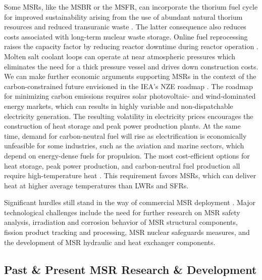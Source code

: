 Some \glspl{MSR}, like the \gls{MSBR} or the \gls{MSFR}, can
incorporate the thorium fuel cycle for improved sustainability arising from the
use of abundant natural thorium resources and reduced transuranic waste
\cite{heuer_towards_2014}. The latter consequence also reduces costs
associated with long-term nuclear waste storage. Online fuel reprocessing raises the capacity
factor by reducing reactor downtime during reactor operation \cite{dolan_1_2017}.
Molten salt coolant loops can operate at near atmospheric pressures which eliminates the need for a
thick pressure vessel and drives down construction costs. We can make further economic arguments
supporting \glspl{MSR} in the context of the
carbon-constrained future envisioned in the \gls{IEA}'s \gls{NZE} roadmap
\cite{iea_net_2021}. The roadmap for minimizing carbon emissions requires solar photovoltaic- and
wind-dominated energy markets, which can results in highly variable and non-dispatchable
electricity generation. The resulting volatility in electricity prices
encourages the construction of heat storage and peak power
production plants. At the same time, demand for carbon-neutral
fuel will rise as electrification is economically unfeasible
for some industries, such as the aviation and marine sectors, which depend on
energy-dense fuels for propulsion.
The most cost-efficient options for heat storage, peak power production, and carbon-neutral fuel
production all require high-temperature heat \cite{forsberg_market_2020}.
This requirement favors \glspl{MSR}, which can deliver heat at higher average
temperatures than \glspl{LWR} and \glspl{SFR}.

Significant hurdles still stand in the way of commercial \gls{MSR} deployment \cite{dolan_27_2017}.
Major technological challenges include the need for further research on \gls{MSR} safety analysis,
irradiation and corrosion behavior of \gls{MSR} structural components, fission product tracking
and processing, \gls{MSR} nuclear safeguards measures, and the development of \gls{MSR} hydraulic
and heat exchanger components.

\subsection{Past \& Present \gls{MSR} Research \& Development}

